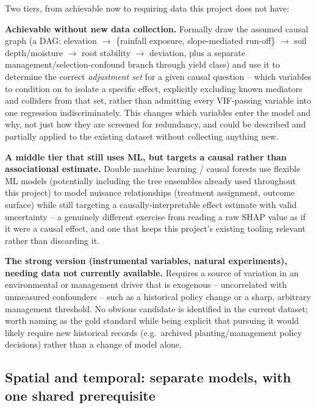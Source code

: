 Two tiers, from achievable now to requiring data this project does not have:

\textbf{Achievable without new data collection.} Formally draw the assumed causal graph (a DAG:
elevation $\to$ \{rainfall exposure, slope-mediated run-off\} $\to$ soil depth/moisture $\to$ root
stability $\to$ deviation, plus a separate management/selection-confound branch through yield
class) and use it to determine the correct \emph{adjustment set} for a given causal question --
which variables to condition on to isolate a specific effect, explicitly excluding known mediators
and colliders from that set, rather than admitting every VIF-passing variable into one regression
indiscriminately. This changes which variables enter the model and why, not just how they are
screened for redundancy, and could be described and partially applied to the existing dataset
without collecting anything new.

\textbf{A middle tier that still uses ML, but targets a causal rather than associational estimate.}
Double machine learning / causal forests \citep{chernozhukov2018double} use flexible ML models
(potentially including the tree ensembles already used throughout this project) to model nuisance
relationships (treatment assignment, outcome surface) while still targeting a causally-interpretable
effect estimate with valid uncertainty -- a genuinely different exercise from reading a raw SHAP
value as if it were a causal effect, and one that keeps this project's existing tooling relevant
rather than discarding it. 

\textbf{The strong version (instrumental variables, natural experiments), needing data not
currently available.} Requires a source of variation in an environmental or management driver that
is exogenous -- uncorrelated with unmeasured confounders -- such as a historical policy change or a
sharp, arbitrary management threshold. No obvious candidate is identified in the current dataset;
worth naming as the gold standard while being explicit that pursuing it would likely require new
historical records (e.g.\ archived planting/management policy decisions) rather than a change of
model alone.

\subsection{Spatial and temporal: separate models, with one shared prerequisite}
\label{sec:futurework-temporal-spatial}

